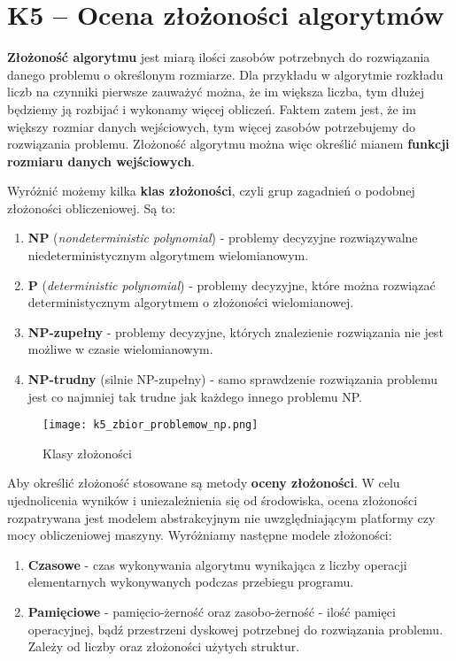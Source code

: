 \section{K5 -- Ocena złożoności algorytmów}

\textbf{Złożoność algorytmu} jest miarą ilości zasobów potrzebnych do rozwiązania danego problemu o określonym rozmiarze. Dla przykładu w algorytmie rozkładu liczb na czynniki pierwsze zauważyć można, że im większa liczba, tym dłużej będziemy ją rozbijać i wykonamy więcej obliczeń. Faktem zatem jest, że im większy rozmiar danych wejściowych, tym więcej zasobów potrzebujemy do rozwiązania problemu. Złożoność algorytmu można więc określić mianem \textbf{funkcji rozmiaru danych wejściowych}.

Wyróżnić możemy kilka \textbf{klas złożoności}, czyli grup zagadnień o podobnej złożoności obliczeniowej. Są to:
\begin{enumerate}
	\item \textbf{NP} (\textit{nondeterministic polynomial}) - problemy decyzyjne rozwiązywalne niedeterministycznym algorytmem wielomianowym.
	\item \textbf{P} (\textit{deterministic polynomial}) - problemy decyzyjne, które można rozwiązać deterministycznym algorytmem o złożoności wielomianowej.
	\item \textbf{NP-zupełny} - problemy decyzyjne, których znalezienie rozwiązania nie jest możliwe w czasie wielomianowym.
	\item \textbf{NP-trudny} (silnie NP-zupełny) - samo sprawdzenie rozwiązania problemu jest co najmniej tak trudne jak każdego innego problemu NP.
\end{enumerate}

\begin{figure}[!h]
\centering
\texttt{[image: k5\_zbior\_problemow\_np.png]}
\caption{Klasy złożoności}
\end{figure}

Aby określić złożoność stosowane są metody \textbf{oceny złożoności}. W celu ujednolicenia wyników i uniezależnienia się od środowiska, ocena złożoności rozpatrywana jest modelem abstrakcyjnym nie uwzględniającym platformy czy mocy obliczeniowej maszyny. Wyróżniamy następne modele złożoności:
\begin{enumerate}
	\item \textbf{Czasowe} - czas wykonywania algorytmu wynikająca z liczby operacji elementarnych wykonywanych podczas przebiegu programu.
	\item \textbf{Pamięciowe} - pamięcio-żerność oraz zasobo-żerność - ilość pamięci operacyjnej, bądź przestrzeni dyskowej potrzebnej do rozwiązania problemu. Zależy od liczby oraz złożoności użytych struktur.
\end{enumerate}

